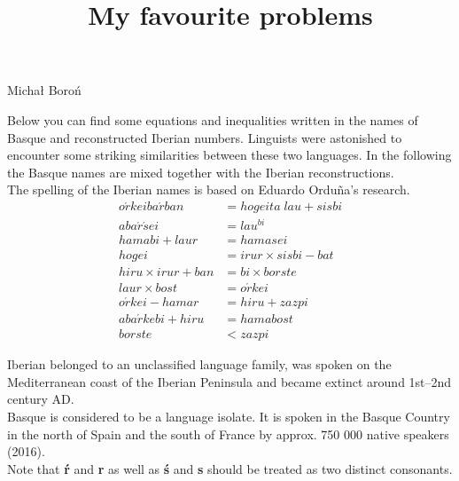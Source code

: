 \documentclass[a4paper, 12pt, english]{article}
\author{}
\date{}
\title{\textbf{My favourite problems}\vspace{-4em}}
\begin{document}
\maketitle{}

\begin{problem*}{Michał Boroń}

Below you can find some equations and inequalities written in the names of Basque and reconstructed Iberian numbers.
Linguists were astonished to encounter some striking similarities between these two languages.
In the following the Basque names are mixed together with the Iberian reconstructions.\\
The spelling of the Iberian names is based on Eduardo Ordu\~na's research.
\begin{align}
o\acute{r}keiba\acute{r}ban &= hogeita\; lau + sisbi\label{eq:first} \\
aba\acute{r}\acute{s}ei &= lau^{bi} \\
hamabi + laur &= hamasei \\
hogei &= irur \times sisbi - bat \\
hiru \times irur + ban &= bi \times borste \\
laur \times bost &= o\acute{r}kei \\
o\acute{r}kei - hamar &= hiru + zazpi \\
aba\acute{r}kebi + hiru &= hamabost \\
borste &< zazpi\label{eq:last}
\end{align}

\begin{tasks}

\end{tasks}

\begin{langinfo}
Iberian belonged to an unclassified language family, was spoken on the Mediterranean coast of the Iberian Peninsula
and became extinct around 1st--2nd century AD.\\
\indent Basque is considered to be a language isolate.
It is spoken in the Basque Country in the north of Spain and the south of France by approx. 750 000 native speakers (2016).\\

Note that \textbf{\'r} and \textbf{r} as well as \textbf{\'s} and \textbf{s} should be treated as two distinct consonants.
\end{langinfo}

\end{problem*}
\end{document}
